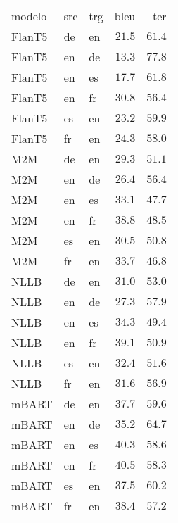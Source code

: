 \begin{tabular}{lllrr}
modelo & src & trg & bleu & ter \\
FlanT5 & de & en & $21.5$ & $61.4$ \\
FlanT5 & en & de & $13.3$ & $77.8$ \\
FlanT5 & en & es & $17.7$ & $61.8$ \\
FlanT5 & en & fr & $30.8$ & $56.4$ \\
FlanT5 & es & en & $23.2$ & $59.9$ \\
FlanT5 & fr & en & $24.3$ & $58.0$ \\
M2M & de & en & $29.3$ & $51.1$ \\
M2M & en & de & $26.4$ & $56.4$ \\
M2M & en & es & $33.1$ & $47.7$ \\
M2M & en & fr & $38.8$ & $48.5$ \\
M2M & es & en & $30.5$ & $50.8$ \\
M2M & fr & en & $33.7$ & $46.8$ \\
NLLB & de & en & $31.0$ & $53.0$ \\
NLLB & en & de & $27.3$ & $57.9$ \\
NLLB & en & es & $34.3$ & $49.4$ \\
NLLB & en & fr & $39.1$ & $50.9$ \\
NLLB & es & en & $32.4$ & $51.6$ \\
NLLB & fr & en & $31.6$ & $56.9$ \\
mBART & de & en & $37.7$ & $59.6$ \\
mBART & en & de & $35.2$ & $64.7$ \\
mBART & en & es & $40.3$ & $58.6$ \\
mBART & en & fr & $40.5$ & $58.3$ \\
mBART & es & en & $37.5$ & $60.2$ \\
mBART & fr & en & $38.4$ & $57.2$ \\
\end{tabular}
